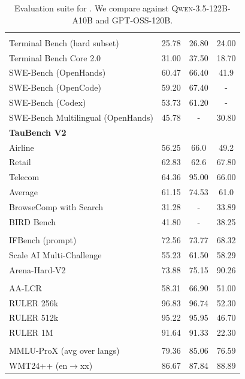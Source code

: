 \begin{table}[!htp]
\begin{tabular}{l|c c c}
\midrule
\rowcolor{black!5}
\multicolumn{4}{l}{\textbf{Agentic}} \\
Terminal Bench (hard subset) & 25.78 & 26.80 & 24.00 \\
Terminal Bench Core 2.0 & 31.00 & 37.50 & 18.70 \\
SWE-Bench (OpenHands) & 60.47 & 66.40 & 41.9 \\
SWE-Bench (OpenCode) & 59.20 & 67.40 & - \\
SWE-Bench (Codex) & 53.73 & 61.20 & - \\
SWE-Bench Multilingual (OpenHands) & 45.78 & - & 30.80 \\
\textbf{TauBench V2} &  &  &  \\
\quad Airline & 56.25 & 66.0 & 49.2  \\
\quad Retail & 62.83 & 62.6 & 67.80 \\
\quad Telecom & 64.36 & 95.00 & 66.00 \\
\quad Average & 61.15 & 74.53 & 61.0 \\
BrowseComp with Search& 31.28 & - & 33.89 \\
BIRD Bench & 41.80 & - & 38.25 \\

\midrule
\rowcolor{black!5}
\multicolumn{4}{l}{\textbf{Chat \& Instruction Following}} \\
IFBench (prompt) & 72.56 & 73.77 & 68.32 \\
Scale AI Multi-Challenge & 55.23 & 61.50 & 58.29 \\
Arena-Hard-V2 & 73.88 & 75.15 & 90.26 \\

\midrule
\rowcolor{black!5}
\multicolumn{4}{l}{\textbf{Long Context}} \\
AA-LCR & 58.31 & 66.90 & 51.00 \\
RULER 256k & 96.83 & 96.74 & 52.30 \\
RULER 512k & 95.22 & 95.95 & 46.70 \\
RULER 1M & 91.64 & 91.33 & 22.30 \\

\midrule
\rowcolor{black!5}
\multicolumn{4}{l}{\textbf{Multilingual}} \\
MMLU-ProX (avg over langs) & 79.36 & 85.06 & 76.59 \\
WMT24++ (en$\rightarrow$xx) & 86.67 & 87.84 & 88.89 \\

\bottomrule
\end{tabular}

\caption{
Evaluation suite for \ourmodel. We compare against \textsc{Qwen-3.5-122B-A10B} and \textsc{GPT-OSS-120B}.
}
\label{tab:super_comparison}
\end{table}

